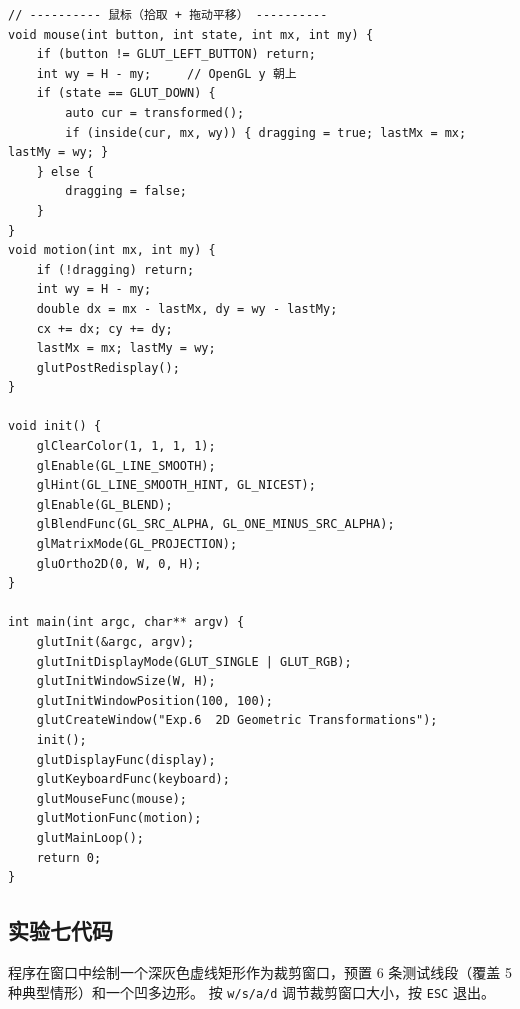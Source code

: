 \documentclass[a4paper,12pt]{ctexart}
\begin{document}
\begin{lstlisting}[style=cppstyle,caption={二维几何变换 —— 完整源代码}]
// ---------- 鼠标（拾取 + 拖动平移） ----------
void mouse(int button, int state, int mx, int my) {
    if (button != GLUT_LEFT_BUTTON) return;
    int wy = H - my;     // OpenGL y 朝上
    if (state == GLUT_DOWN) {
        auto cur = transformed();
        if (inside(cur, mx, wy)) { dragging = true; lastMx = mx; lastMy = wy; }
    } else {
        dragging = false;
    }
}
void motion(int mx, int my) {
    if (!dragging) return;
    int wy = H - my;
    double dx = mx - lastMx, dy = wy - lastMy;
    cx += dx; cy += dy;
    lastMx = mx; lastMy = wy;
    glutPostRedisplay();
}

void init() {
    glClearColor(1, 1, 1, 1);
    glEnable(GL_LINE_SMOOTH);
    glHint(GL_LINE_SMOOTH_HINT, GL_NICEST);
    glEnable(GL_BLEND);
    glBlendFunc(GL_SRC_ALPHA, GL_ONE_MINUS_SRC_ALPHA);
    glMatrixMode(GL_PROJECTION);
    gluOrtho2D(0, W, 0, H);
}

int main(int argc, char** argv) {
    glutInit(&argc, argv);
    glutInitDisplayMode(GLUT_SINGLE | GLUT_RGB);
    glutInitWindowSize(W, H);
    glutInitWindowPosition(100, 100);
    glutCreateWindow("Exp.6  2D Geometric Transformations");
    init();
    glutDisplayFunc(display);
    glutKeyboardFunc(keyboard);
    glutMouseFunc(mouse);
    glutMotionFunc(motion);
    glutMainLoop();
    return 0;
}
\end{lstlisting}

\subsection{实验七代码}

程序在窗口中绘制一个深灰色虚线矩形作为裁剪窗口，预置 6 条测试线段（覆盖 5 种典型情形）和一个凹多边形。
按 \texttt{w/s/a/d} 调节裁剪窗口大小，按 \texttt{ESC} 退出。
\end{document}
